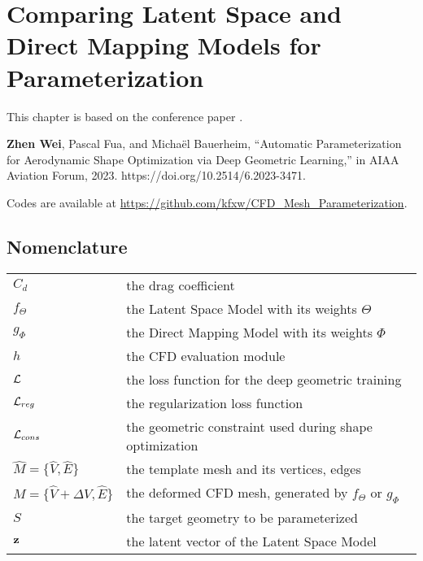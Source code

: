 \chapter{Comparing Latent Space and Direct Mapping Models for Parameterization}
\label{ch4}

This chapter is based on the conference paper \cite{aa.Wei2023b}.

\textbf{Zhen Wei}, Pascal Fua, and Michaël Bauerheim, “Automatic Parameterization for Aerodynamic Shape Optimization via Deep Geometric Learning,” in AIAA Aviation Forum, 2023. https://doi.org/10.2514/6.2023-3471.

Codes are available at \url{https://github.com/kfxw/CFD_Mesh_Parameterization}.

\section{Nomenclature}

{\renewcommand\arraystretch{1.0}
\noindent\begin{longtable*}{@{}l @{\quad=\quad} l@{}}
$C_d$ & the drag coefficient \\
$f_\Theta$ & the Latent Space Model with its weights $\Theta$ \\
$g_\Phi$ & the Direct Mapping Model with its weights $\Phi$ \\
$h$ & the CFD evaluation module \\
$\mathcal{L}$ & the loss function for the deep geometric training \\
$\mathcal{L}_{reg}$ & the regularization loss function \\
$\mathcal{L}_{cons}$ & the geometric constraint used during shape optimization \\
$\hat{M}=\{\hat{V},\hat{E}\}$ & the template mesh and its vertices, edges \\
$M=\{\hat{V}+\Delta V,\hat{E}\}$ & the deformed CFD mesh, generated by $f_\Theta$ or $g_\Phi$ \\
$S$ & the target geometry to be parameterized \\
$\mathbf{z}$ & the latent vector of the Latent Space Model \\
\end{longtable*}}




